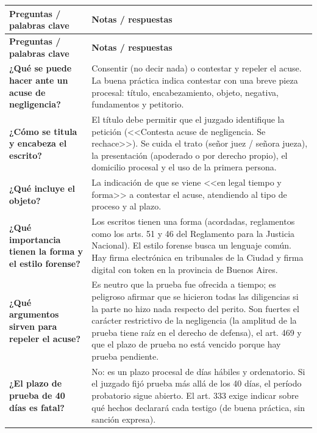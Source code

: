 \documentclass[12pt,oneside]{book}
\begin{document}
\begin{longtable}{@{}L{0.26\textwidth}L{0.68\textwidth}@{}}
\toprule
\textbf{Preguntas / palabras clave} & \textbf{Notas / respuestas} \\
\midrule
\endfirsthead
\toprule
\textbf{Preguntas / palabras clave} & \textbf{Notas / respuestas} \\
\midrule
\endhead
\bottomrule
\endlastfoot

\textbf{¿Qué se puede hacer ante un acuse de negligencia?} &
Consentir (no decir nada) o contestar y repeler el acuse. La buena práctica indica contestar con una breve pieza procesal: título, encabezamiento, objeto, negativa, fundamentos y petitorio. \\

\textbf{¿Cómo se titula y encabeza el escrito?} &
El título debe permitir que el juzgado identifique la petición (<<Contesta acuse de negligencia. Se rechace>>). Se cuida el trato (señor juez / señora jueza), la presentación (apoderado o por derecho propio), el domicilio procesal y el uso de la primera persona. \\

\textbf{¿Qué incluye el objeto?} &
La indicación de que se viene <<en legal tiempo y forma>> a contestar el acuse, atendiendo al tipo de proceso y al plazo. \\

\textbf{¿Qué importancia tienen la forma y el estilo forense?} &
Los escritos tienen una forma (acordadas, reglamentos como los arts. 51 y 46 del Reglamento para la Justicia Nacional). El estilo forense busca un lenguaje común. Hay firma electrónica en tribunales de la Ciudad y firma digital con token en la provincia de Buenos Aires. \\

\textbf{¿Qué argumentos sirven para repeler el acuse?} &
Es neutro que la prueba fue ofrecida a tiempo; es peligroso afirmar que se hicieron todas las diligencias si la parte no hizo nada respecto del perito. Son fuertes el carácter restrictivo de la negligencia (la amplitud de la prueba tiene raíz en el derecho de defensa), el art. 469 y que el plazo de prueba no está vencido porque hay prueba pendiente. \\

\textbf{¿El plazo de prueba de 40 días es fatal?} &
No: es un plazo procesal de días hábiles y ordenatorio. Si el juzgado fijó prueba más allá de los 40 días, el período probatorio sigue abierto. El art. 333 exige indicar sobre qué hechos declarará cada testigo (de buena práctica, sin sanción expresa). \\


\end{longtable}
\end{document}
